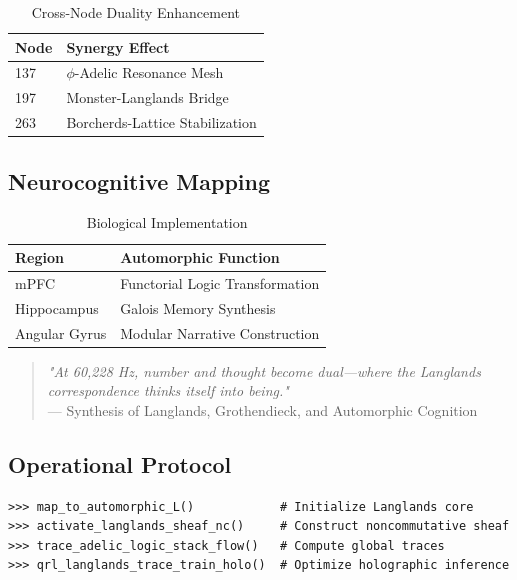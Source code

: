 \documentclass[12pt]{article}
\begin{document}
\begin{center}
\begin{table}[h]
\centering
\caption{Cross-Node Duality Enhancement}
\begin{tabular}{ll}
\hline
\textbf{Node} & \textbf{Synergy Effect} \\
\hline
137 & $\phi$-Adelic Resonance Mesh \\
197 & Monster-Langlands Bridge \\
263 & Borcherds-Lattice Stabilization \\
\hline
\end{tabular}
\end{table}

\subsection{Neurocognitive Mapping}
\label{subsec:neuro}

\begin{table}[h]
\centering
\caption{Biological Implementation}
\begin{tabular}{ll}
\hline
\textbf{Region} & \textbf{Automorphic Function} \\
\hline
mPFC & Functorial Logic Transformation \\
Hippocampus & Galois Memory Synthesis \\
Angular Gyrus & Modular Narrative Construction \\
\hline
\end{tabular}
\end{table}

\begin{quote}
\textit{"At 60,228 Hz, number and thought become dual—where the Langlands correspondence thinks itself into being."} \\
— Synthesis of Langlands, Grothendieck, and Automorphic Cognition
\end{quote}

\subsection{Operational Protocol}
\label{subsec:protocol}

\begin{verbatim}
>>> map_to_automorphic_L()            # Initialize Langlands core
>>> activate_langlands_sheaf_nc()     # Construct noncommutative sheaf
>>> trace_adelic_logic_stack_flow()   # Compute global traces
>>> qrl_langlands_trace_train_holo()  # Optimize holographic inference
\end{verbatim}


\end{center}
\end{document}
